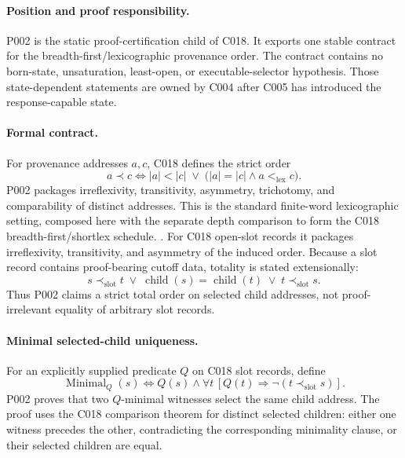 
\paragraph*{Position and proof responsibility.}
P002 is the static proof-certification child of C018.  It exports one stable
contract for the breadth-first/lexicographic provenance order.  The contract
contains no born-state, unsaturation, least-open, or executable-selector
hypothesis.  Those state-dependent statements are owned by C004 after C005 has
introduced the response-capable state.

\paragraph*{Formal contract.}
For provenance addresses $a,c$, C018 defines the strict order
\[
  a\prec c
  \iff
  |a|<|c|\;\lor\;\bigl(|a|=|c|\land a<_{\mathrm{lex}}c\bigr).
\]
P002 packages irreflexivity, transitivity, asymmetry, trichotomy, and
comparability of distinct addresses.  This is the standard finite-word
lexicographic setting, composed here with the separate depth comparison to form
the C018 breadth-first/shortlex schedule.
\cite[Ch.~1, finite words and lexicographic order]{Lothaire1997CombinatoricsWords}.
For C018 open-slot records it packages
irreflexivity, transitivity, and asymmetry of the induced order.  Because a
slot record contains proof-bearing cutoff data, totality is stated
extensionally:
\[
  s\prec_{\mathrm{slot}}t
  \;\lor\;
  \operatorname{child}(s)=\operatorname{child}(t)
  \;\lor\;
  t\prec_{\mathrm{slot}}s.
\]
Thus P002 claims a strict total order on selected child addresses, not
proof-irrelevant equality of arbitrary slot records.

\paragraph*{Minimal selected-child uniqueness.}
For an explicitly supplied predicate $Q$ on C018 slot records, define
\[
  \operatorname{Minimal}_Q(s)
  \iff
  Q(s)\land \forall t\,[Q(t)\Rightarrow\neg(t\prec_{\mathrm{slot}}s)].
\]
P002 proves that two $Q$-minimal witnesses select the same child address.  The
proof uses the C018 comparison theorem for distinct selected children: either
one witness precedes the other, contradicting the corresponding minimality
clause, or their selected children are equal.

